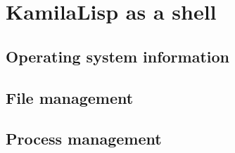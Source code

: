 
\chapter{KamilaLisp as a shell}

\section{Operating system information}

\section{File management}

\section{Process management}
